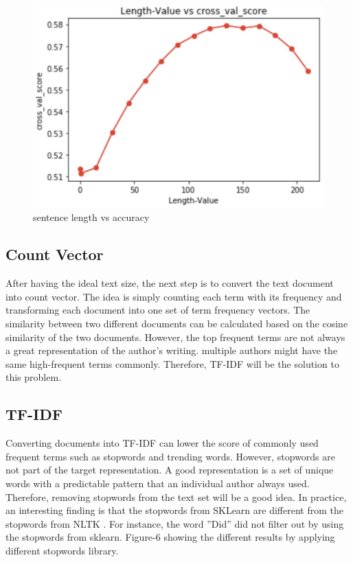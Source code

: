 \documentclass[journal,12pt,onecolumn]{IEEEtran}
\begin{document}
\begin{figure}[h]
    \centering
    \includegraphics[width=0.5\linewidth]{sentence_length.jpg}
    \caption{sentence length vs accuracy}
    \label{fig:k_length}
\end{figure}

\subsection{Count Vector}
After having the ideal text size, the next step is to convert the text document into count vector. The idea is simply counting each term with its frequency and transforming each document into one set of term frequency vectors. The similarity between two different documents can be calculated based on the cosine similarity of the two documents. However, the top frequent terms are not always a great representation of the author’s writing. multiple authors might have the same high-frequent terms commonly. Therefore, TF-IDF will be the solution to this problem.

\subsection{TF-IDF}
Converting documents into TF-IDF can lower the score of commonly used frequent terms such as stopwords and trending words. However, stopwords are not part of the target representation. A good representation is a set of unique words with a predictable pattern that an individual author always used. Therefore, removing stopwords from the text set will be a good idea. In practice, an interesting finding is that the stopwords from SKLearn \cite{sklearn_tfidf} are different from the stopwords from NLTK \cite{nltk_tfidf}. For instance, the word ”Did” did not filter out by using the stopwords from sklearn. Figure-6 showing the different results by applying different stopwords library.
\end{document}
